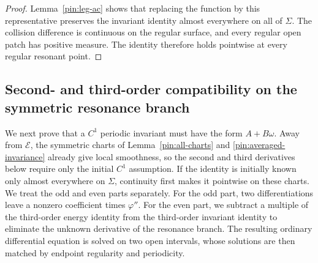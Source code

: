 \begin{proof}
Lemma~\ref{pin:leg-ac} shows that replacing the function by this
representative preserves the invariant identity almost everywhere on
all of $\Sigma$. The collision difference is continuous on the regular
surface, and every regular open patch has positive measure. The
identity therefore holds pointwise at every regular resonant point.
\end{proof}

\subsection{Second- and third-order compatibility on the symmetric resonance branch}
\label{pin:jets}

We next prove that a $C^1$ periodic invariant must have the form
$A+B\omega$. Away from $\mathcal E$, the symmetric charts of
Lemma~\ref{pin:all-charts} and \eqref{pin:averaged-invariance} already
give local smoothness, so the second and third derivatives below require
only the initial $C^1$ assumption. If the identity is initially known
only almost everywhere on $\Sigma$, continuity first makes it pointwise
on these charts. We treat the odd and even parts separately. For the
odd part, two differentiations leave a nonzero coefficient times
$\varphi''$. For the even part, we subtract a multiple of the
third-order energy identity from the third-order invariant identity to
eliminate the unknown derivative of the resonance branch. The resulting
ordinary differential equation is solved on two open intervals, whose
solutions are then matched by endpoint regularity and periodicity.

